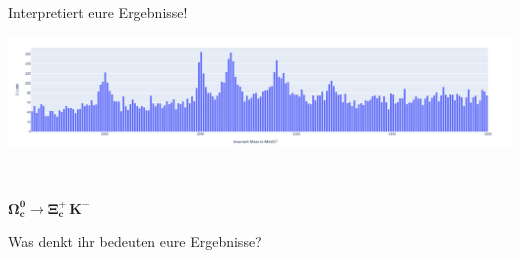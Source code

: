 \begin{frame}{Interpretiert eure Ergebnisse!}

\includegraphics[width=\textwidth]{Figures Discussion/Result_OmegaC.png}

\\ 
\begin{center}
  \Large  $\mathbf{ \Omega_c^0 \rightarrow \Xi_c^+\,K^-}$
\end{center}



   \begin{center} Was denkt ihr bedeuten eure Ergebnisse? \end{center}

\end{frame}
